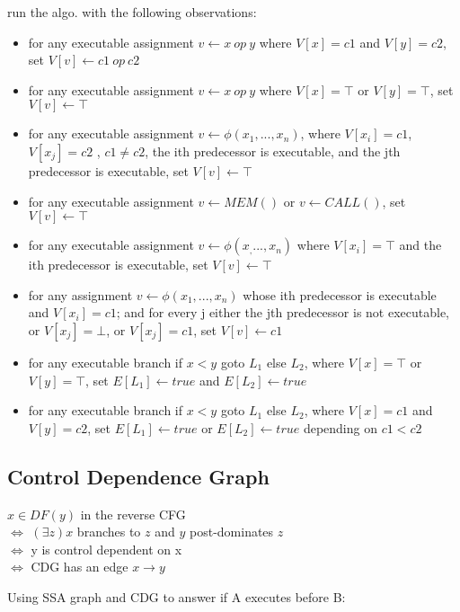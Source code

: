 \documentclass[8pt]{extarticle}
\begin{document}
\begin{multicols*}{2}
  run the algo. with the following observations:

  \begin{itemize}
    \item for any executable assignment $v \leftarrow x\ op\ y$ where $V[x] = c1$ and $V[y] = c2$, set $V[v] \leftarrow c1\ op\ c2$
    \item for any executable assignment $v \leftarrow x\ op\ y$ where $V[x] = \top$ or $V[y] = \top$, set $V[v] \leftarrow \top$
    \item for any executable assignment $v \leftarrow \phi(x_1 , ..., x_n )$, where $V[x_i] = c1$, $V[x_j] = c2$ , $c1 \neq c2$, the ith predecessor is executable, and the jth predecessor is executable, set $V[v] \leftarrow \top$
    \item for any executable assignment $v \leftarrow MEM()$ or $v \leftarrow CALL()$, set $V[v] \leftarrow \top$
    \item for any executable assignment $v \leftarrow \phi(x _ , ..., x_n)$ where $V[x_i] = \top$ and the ith predecessor is executable, set $V[v] \leftarrow \top$
    \item for any assignment $v \leftarrow \phi(x_1, ..., x_n)$ whose ith predecessor is executable and $V[x_i] = c1$; and for every j either the jth predecessor is not executable, or $V[x_j] = \bot$, or $V[x_j] = c1$, set $V[v] \leftarrow c1$
    \item for any executable branch if $x < y$ goto $L_1$ else $L_2$, where $V[x] = \top$ or $V[y] = \top$, set $E[L_1] \leftarrow true$ and $E[L_2] \leftarrow true$
    \item for any executable branch if $x < y$ goto $L_1$ else $L_2$, where $V[x] = c1$ and $V[y] = c2$, set $E[L_1] \leftarrow true$ or $E[L_2] ← true$ depending on $c1 < c2$
  \end{itemize}

  \subsection{Control Dependence Graph}
  
  $x \in DF(y)$ in the reverse CFG\\
  $\iff$ $(\exists z) x$ branches to $z$ and $y$ post-dominates $z$\\
  $\iff$ y is control dependent on x\\
  $\iff$ CDG has an edge $x \rightarrow y$

  
  Using SSA graph and CDG to answer if A executes before B:


\end{multicols*}
\end{document}
